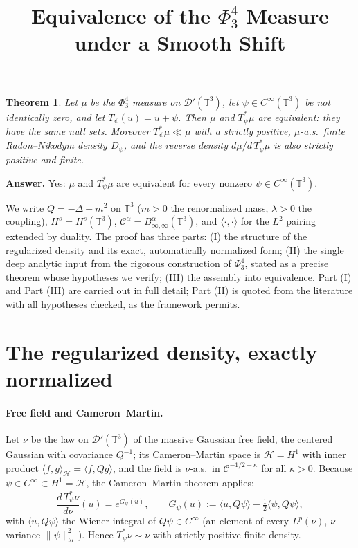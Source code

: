 \documentclass[12pt]{article}
\title{Equivalence of the $\Phi^4_3$ Measure under a Smooth Shift}
\author{}
\date{}
\newcommand{\bT}{\mathbb{T}}
\newcommand{\Dp}{\mathcal{D}'}
\newcommand{\kp}{\kappa}
\theoremstyle{plain}
\newtheorem{theorem}{Theorem}
\theoremstyle{definition}
\begin{document}
\maketitle

\begin{theorem}\label{thm:main}
Let $\mu$ be the $\Phi^4_3$ measure on $\Dp(\bT^3)$, let $\psi\in C^\infty(\bT^3)$ be
not identically zero, and let $T_\psi(u)=u+\psi$. Then $\mu$ and $T_\psi^\ast\mu$ are
equivalent: they have the same null sets. Moreover $T_\psi^\ast\mu\ll\mu$ with a
strictly positive, $\mu$-a.s.\ finite Radon--Nikodym density $D_\psi$, and the reverse
density $d\mu/d\,T_\psi^\ast\mu$ is also strictly positive and finite.
\end{theorem}

\noindent\textbf{Answer.} Yes: $\mu$ and $T_\psi^\ast\mu$ are equivalent for every
nonzero $\psi\in C^\infty(\bT^3)$.

\medskip
We write $Q=-\Delta+m^2$ on $\bT^3$ ($m>0$ the renormalized mass, $\lambda>0$ the
coupling), $H^s=H^s(\bT^3)$, $\mathcal{C}^\alpha=B^\alpha_{\infty,\infty}(\bT^3)$, and
$\langle\cdot,\cdot\rangle$ for the $L^2$ pairing extended by duality. The proof has
three parts: (I) the structure of the regularized density and its exact, automatically
normalized form; (II) the single deep analytic input from the rigorous construction of
$\Phi^4_3$, stated as a precise theorem whose hypotheses we verify; (III) the assembly
into equivalence. Part (I) and Part (III) are carried out in full detail; Part (II) is
quoted from the literature with all hypotheses checked, as the framework permits.

\section{The regularized density, exactly normalized}\label{sec:reg}

\paragraph{Free field and Cameron--Martin.}
Let $\nu$ be the law on $\Dp(\bT^3)$ of the massive Gaussian free field, the centered
Gaussian with covariance $Q^{-1}$; its Cameron--Martin space is $\mathcal H=H^1$ with
inner product $\langle f,g\rangle_{\mathcal H}=\langle f,Qg\rangle$, and the field is
$\nu$-a.s.\ in $\mathcal{C}^{-1/2-\kp}$ for all $\kp>0$. Because $\psi\in
C^\infty\subset H^1=\mathcal H$, the Cameron--Martin theorem applies:
\begin{equation}\label{eq:CM}
\frac{d\,T_\psi^\ast\nu}{d\nu}(u)=e^{G_\psi(u)},\qquad
G_\psi(u):=\langle u,Q\psi\rangle-\tfrac12\langle\psi,Q\psi\rangle,
\end{equation}
with $\langle u,Q\psi\rangle$ the Wiener integral of $Q\psi\in C^\infty$ (an element of
every $L^p(\nu)$, $\nu$-variance $\|\psi\|_{\mathcal H}^2$). Hence $T_\psi^\ast\nu\sim\nu$
with strictly positive finite density.
\end{document}
